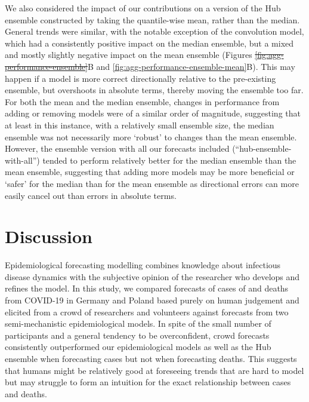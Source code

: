 \documentclass[10pt,letterpaper]{article} %
\providecommand{\DIFaddtex}[1]{{\protect\color{blue}\uwave{#1}}} %
\providecommand{\DIFdeltex}[1]{{\protect\color{red}\sout{#1}}}                      %
\providecommand{\DIFaddbegin}{} %
\providecommand{\DIFaddend}{} %
\providecommand{\DIFdelbegin}{} %
\providecommand{\DIFdelend}{} %
\providecommand{\DIFadd}[1]{\texorpdfstring{\DIFaddtex{#1}}{#1}} %
\providecommand{\DIFdel}[1]{\texorpdfstring{\DIFdeltex{#1}}{}} %
\newcommand{\DIFscaledelfig}{0.5}
\newlength{\DIFdelgraphicswidth} %
\newlength{\DIFdelgraphicsheight} %
\newcommand{\DIFaddincludegraphics}[2][]{{\color{blue}\fbox{\DIFOincludegraphics[#1]{#2}}}} %
\newcommand{\DIFdelincludegraphics}[2][]{%
\sbox{\DIFdelgraphicsbox}{\DIFOincludegraphics[#1]{#2}}%
\settoboxwidth{\DIFdelgraphicswidth}{\DIFdelgraphicsbox} %
\settoboxtotalheight{\DIFdelgraphicsheight}{\DIFdelgraphicsbox} %
\scalebox{\DIFscaledelfig}{%
\parbox[b]{\DIFdelgraphicswidth}{\usebox{\DIFdelgraphicsbox}\\[-\baselineskip] \rule{\DIFdelgraphicswidth}{0em}}\llap{\resizebox{\DIFdelgraphicswidth}{\DIFdelgraphicsheight}{%
\setlength{\unitlength}{\DIFdelgraphicswidth}%
\begin{picture}(1,1)%
\thicklines\linethickness{2pt} %
{\color[rgb]{1,0,0}\put(0,0){\framebox(1,1){}}}%
{\color[rgb]{1,0,0}\put(0,0){\line( 1,1){1}}}%
{\color[rgb]{1,0,0}\put(0,1){\line(1,-1){1}}}%
\end{picture}%
}\hspace*{3pt}}} %
} %
\DeclareRobustCommand{\DIFaddbegin}{\DIFOaddbegin \let\includegraphics\DIFaddincludegraphics} %
\DeclareRobustCommand{\DIFaddend}{\DIFOaddend \let\includegraphics\DIFOincludegraphics} %
\DeclareRobustCommand{\DIFdelbegin}{\DIFOdelbegin \let\includegraphics\DIFdelincludegraphics} %
\DeclareRobustCommand{\DIFdelend}{\DIFOaddend \let\includegraphics\DIFOincludegraphics} %
\begin{document}
We also considered the impact of our contributions on a version of the
Hub ensemble constructed by taking the quantile-wise mean, rather than
the median. General trends were similar, with the notable exception of
the convolution model, which had a consistently positive impact on the
median ensemble, but a mixed and mostly slightly negative impact on the
mean ensemble (Figures \DIFdelbegin \DIFdel{\ref{fig:agg-performance-ensemble}}\DIFdelend \DIFaddbegin \DIFadd{\ref{fig:agg-performance-ensemble-rel}}\DIFaddend B and
\ref{fig:agg-performance-ensemble-mean}B). This may happen if a model is
more correct directionally relative to the pre-existing ensemble, but
overshoots in absolute terms, thereby moving the ensemble too far. For
both the mean and the median ensemble, changes in performance from
adding or removing models were of a similar order of magnitude,
suggesting that at least in this instance, with a relatively small
ensemble size, the median ensemble was not necessarily more `robust' to
changes than the mean ensemble. However, the ensemble version with all
our forecasts included (``hub-ensemble-with-all'') tended to perform
relatively better for the median ensemble than the mean ensemble,
suggesting that adding more models may be more beneficial or `safer' for
the median than for the mean ensemble as directional errors can more
easily cancel out than errors in absolute terms.

\hypertarget{discussion}{%
\section{Discussion}\label{discussion}}

Epidemiological forecasting modelling combines knowledge about
infectious disease dynamics with the subjective opinion of the
researcher who develops and refines the model. In this study, we
compared forecasts of cases of and deaths from COVID-19 in Germany and
Poland based purely on human judgement and elicited from a crowd of
researchers and volunteers against forecasts from two semi-mechanistic
epidemiological models. In spite of the small number of participants and
a general tendency to be overconfident, crowd forecasts consistently
outperformed our epidemiological models as well as the Hub ensemble when
forecasting cases but not when forecasting deaths. This suggests that
humans might be relatively good at foreseeing trends that are hard to
model but may struggle to form an intuition for the exact relationship
between cases and deaths.
\end{document}
